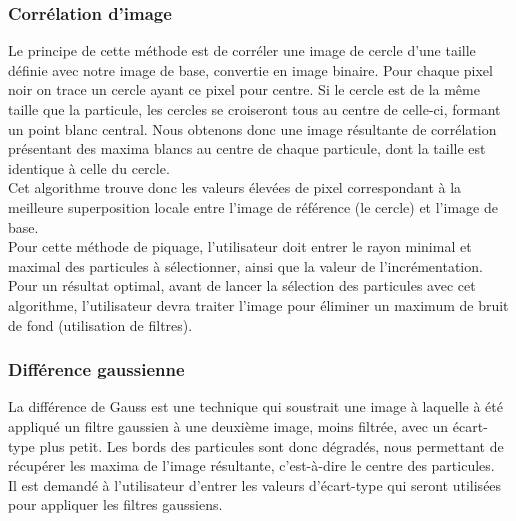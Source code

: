 \subsubsection{Corrélation d'image}
Le principe de cette méthode est de corréler une image de cercle d'une taille définie avec notre image de base, convertie en image binaire. Pour chaque pixel noir on trace un cercle ayant ce pixel pour centre.
Si le cercle est de la m\^eme taille que la particule, les cercles se croiseront tous au centre de celle-ci, formant un point blanc central. Nous obtenons donc une image résultante de corrélation présentant des maxima blancs au centre de chaque particule, dont la taille est identique à celle du cercle.\\
Cet algorithme trouve donc les valeurs élevées de pixel correspondant à la meilleure superposition locale entre l'image de référence (le cercle) et l'image de base.\\

\noindent
Pour cette méthode de piquage, l'utilisateur doit entrer le rayon minimal et maximal des particules à sélectionner, ainsi que la valeur de l'incrémentation.\\ Pour un résultat optimal, avant de lancer la sélection des particules avec cet algorithme, l'utilisateur devra traiter l'image pour éliminer un maximum de bruit de fond (utilisation de filtres).

\subsubsection{Différence gaussienne}
La différence de Gauss est une technique qui soustrait une image à laquelle à été appliqué un filtre gaussien à une deuxième image, moins filtrée, avec un écart-type plus petit. Les bords des particules sont donc dégradés, nous permettant de récupérer les maxima de l'image résultante, c'est-à-dire le centre des particules.\\
\noindent
Il est demandé à l'utilisateur d'entrer les valeurs d'écart-type qui seront utilisées pour appliquer les filtres gaussiens.

